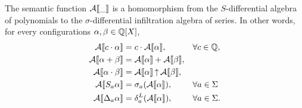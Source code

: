 \begin{lemma}
    \label{lem:infiltration automata - properties of the semantics}
    The semantic function $\mathcal A\llbracket\_\rrbracket$ is a homomorphism
    from the $S$-differential algebra of polynomials
    to the $\sigma$-differential infiltration algebra of series.
    In other words, for every configurations $\alpha, \beta \in \mathbb Q[X]$,
    \begin{align}
        \label{eq:infiltration:sem:scalar-product}
        \mathcal A\llbracket c \cdot \alpha\rrbracket
            &= c \cdot \mathcal A\llbracket\alpha\rrbracket,
            &&\forall c \in \mathbb Q, \\
        \label{eq:infiltration:sem:sum}
        \mathcal A\llbracket\alpha + \beta\rrbracket
            &= \mathcal A\llbracket\alpha\rrbracket + \mathcal A\llbracket\beta\rrbracket, \\
        \label{eq:infiltration:sem:product}
        \mathcal A\llbracket\alpha \cdot \beta\rrbracket
            &= \mathcal A\llbracket\alpha\rrbracket \operatorname{\uparrow} \mathcal A\llbracket\beta\rrbracket, \\
        \label{eq:infiltration:sem:endomorphism}
        \mathcal A\llbracket S_a \alpha\rrbracket
            &= \sigma_a (\mathcal A\llbracket\alpha\rrbracket),
            &&\forall a \in \Sigma \\
        \label{eq:infiltration:sem:derivation}
        \mathcal A\llbracket\Delta_a \alpha\rrbracket
            &= \delta^L_{a} (\mathcal A\llbracket\alpha\rrbracket),
            &&\forall a \in \Sigma.
        \end{align}
\end{lemma}
%
